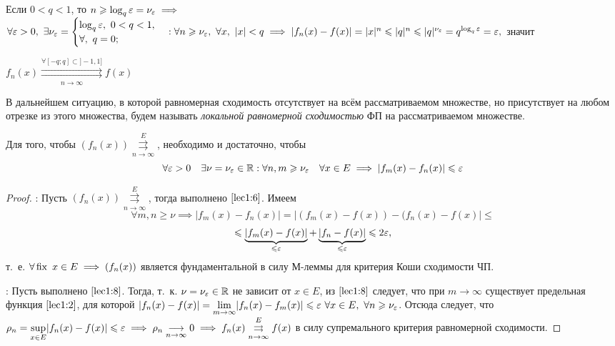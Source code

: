 \documentclass[../../main.tex]{subfiles}
\begin{document}
\begin{exmps}
\begin{enumerate}
Если $0 < q < 1$, то $n \geqslant \log_q\varepsilon = \nu_\varepsilon \implies$
$\forall \eps > 0,\ \exists \nu_\eps = 
\begin{cases}
	\log_q \eps,\ 0 < q < 1, \\
	\forall,\ q = 0;
\end{cases} : \forall n \geq \nu_\eps,\ \forall x,\ |x| < q \implies 
|f_n(x) - f(x)| = |x|^n \leq |q|^n \leq |q|^{\nu_\eps} = 
q^{\log_q \eps} = \eps,$ значит

$f_n(x) \overset{\forall [-q;q] \subset ]-1,1]}
{\underset{n \to \infty}\rightrightarrows} f(x)$
\end{enumerate}

\end{exmps}	

В дальнейшем ситуацию, в которой равномерная сходимость отсутствует на всём 
рассматриваемом множестве, но присутствует на любом отрезке из этого множества,
будем называть \emph{локальной равномерной сходимостью} ФП на
рассматриваемом множестве.

\begin{thm}
Для того, чтобы $(f_n(x)) \overset{E}
{\underset{n \to \infty}\rightrightarrows}$, необходимо и достаточно, 
чтобы 
\begin{equation}
\label{lec1:8}
\forall \varepsilon > 0 \quad \exists \nu=\nu_\varepsilon \in \mathbb{R} :
\forall n,m \geqslant \nu_\varepsilon \quad \forall x \in E \implies 
|f_m(x) - f_n(x)| \leqslant \varepsilon
\end{equation}
\end{thm}	

\begin{proof}
\;

\nec: Пусть $(f_n(x)) \overset{E}
{\underset{n \to \infty}\rightrightarrows}$, тогда выполнено $\eqref{lec1:6}$. 
Имеем
\[\forall m, n \geq \nu \implies |f_m(x) - f_n(x)| = 
|(f_m(x) - f(x)) - (f_n(x) - f(x)| \leq \]
\[ \leqslant \underbrace{|f_m(x) - f(x)|}_{\leqslant \varepsilon} + 
\underbrace{|f_n - f(x)|}_{\leqslant \varepsilon} \leqslant 2\varepsilon,\] т.~е. 
$\forall \operatorname{fix} \ x \in E \implies (f_n(x))$ 
является фундаментальной в силу М-леммы для критерия Коши сходимости ЧП.

\suff: Пусть выполнено $\eqref{lec1:8}$. Тогда, т.~к. 
$\nu=\nu_\varepsilon \in \mathbb{R}$ не зависит от $x \in E$, из $\eqref{lec1:8}$
следует, что при $m \to \infty$ существует предельная функция 
$\eqref{lec1:2}$, для которой $|f_n(x) - f(x)| = 
\underset{m \to \infty}{\lim} |f_n(x) - f_m(x)| \leq  \eps \ 
\forall x \in E,\ \forall n \geq \nu_\eps$. Отсюда следует, что
$\rho_n = \underset{x \in E}{\sup} |f_n(x) - f(x)| \leqslant \varepsilon \implies 
\rho_n \underset{n \to \infty}{\longrightarrow} 0 \implies
f_n(x) \overset{E}
{\underset{n \to \infty}\rightrightarrows} f(x)$
в силу супремального критерия равномерной сходимости. 
\end{proof}	
\end{document}
